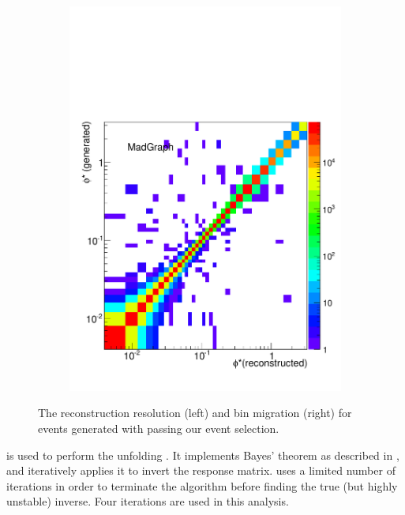 \begin{figure}[!htbp]
\begin{subfigure}[b]{\SideBySidePlotWidth}
        \includegraphics[width=\textwidth]{figures/BinM_M.pdf}
        \caption{}
        \label{fig:bin_migration_matrix}
    \end{subfigure}
    \caption[
        Reconstruction resolution and bin migration.
    ]{
        The \phistar reconstruction resolution (left) and bin migration (right)
        for events generated with \MADGRAPH passing our event selection.
    }
    \label{fig:phistar_resolution_and_bin_migration}
\end{figure}

\RooUnfold is used to perform the unfolding \cite{adye_2011}. It implements
Bayes' theorem as described in \cite{dagostini_1995}, and iteratively applies
it to invert the response matrix. \RooUnfold uses a limited number of
iterations in order to terminate the algorithm before finding the true (but
highly unstable) inverse. Four iterations are used in this analysis.

